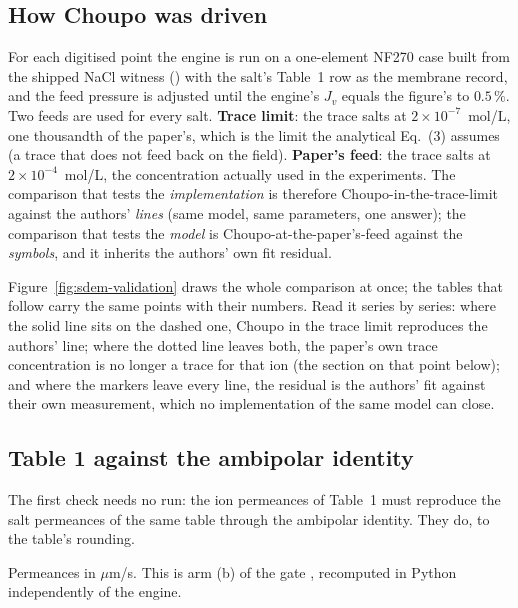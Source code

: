 \subsection*{How Choupo was driven}

For each digitised point the engine is run on a one-element NF270 case built
from the shipped NaCl witness ()
with the salt's Table~1 row as the membrane record, and the feed pressure is
adjusted until the engine's $J_v$ equals the figure's to $0.5\,\%$.  Two
feeds are used for every salt.  \textbf{Trace limit}: the trace salts at
$2\times10^{-7}$~mol/L, one thousandth of the paper's, which is the limit
the analytical Eq.~(3) assumes (a trace that does not feed back on the
field).  \textbf{Paper's feed}: the trace salts at $2\times10^{-4}$~mol/L,
the concentration actually used in the experiments.  The comparison that
tests the \emph{implementation} is therefore Choupo-in-the-trace-limit
against the authors' \emph{lines} (same model, same parameters, one answer);
the comparison that tests the \emph{model} is Choupo-at-the-paper's-feed
against the \emph{symbols}, and it inherits the authors' own fit residual.

Figure~\ref{fig:sdem-validation} draws the whole comparison at once; the
tables that follow carry the same points with their numbers.  Read it
series by series: where the solid line sits on the dashed one, Choupo in
the trace limit reproduces the authors' line; where the dotted line leaves
both, the paper's own trace concentration is no longer a trace for that ion
(the section on that point below); and where the markers leave every line,
the residual is the authors' fit against their own measurement, which no
implementation of the same model can close.



\subsection*{Table 1 against the ambipolar identity}

The first check needs no run: the ion permeances of Table~1 must reproduce
the salt permeances of the same table through the ambipolar identity.  They
do, to the table's rounding.


\noindent Permeances in $\mu$m/s.  This is arm (b) of the gate
, recomputed in Python independently of the
engine.


